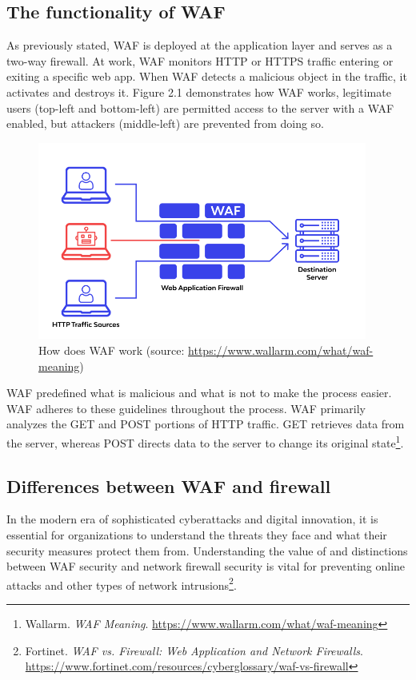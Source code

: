 \subsection{The functionality of WAF}
\label{subsec:waf_work}
\hspace{0.5cm}As previously stated, WAF is deployed at the application layer and serves as a two-way firewall. At work, WAF monitors HTTP or HTTPS traffic entering or exiting a specific web app. When WAF detects a malicious object in the traffic, it activates and destroys it. Figure 2.1 demonstrates how WAF works, legitimate users (top-left and bottom-left) are permitted access to the server with a WAF enabled, but attackers (middle-left) are prevented from doing so.
\begin{figure}[!h]
   
	\centering
	\includegraphics[width=\linewidth, height=6.5cm,keepaspectratio]{figures/wallarmwaf.png}
	\caption{How does WAF work (source: \url{https://www.wallarm.com/what/waf-meaning})}\label{Fig:Data1}
  
\end{figure} 

\newpage
WAF predefined what is malicious and what is not to make the process easier. WAF adheres to these guidelines throughout the process. WAF primarily analyzes the GET and POST portions of HTTP traffic. GET retrieves data from the server, whereas POST directs data to the server to change its original state\footnote{Wallarm. \textit{WAF Meaning}. \url{https://www.wallarm.com/what/waf-meaning}}.



\subsection{Differences between WAF and firewall}
\label{subsec:versus}
\hspace{0.5cm}In the modern era of sophisticated cyberattacks and digital innovation, it is essential for organizations to understand the threats they face and what their security measures protect them from. Understanding the value of and distinctions between WAF security and network firewall security is vital for preventing online attacks and other types of network intrusions\footnote{Fortinet. \textit{WAF vs. Firewall: Web Application and Network Firewalls}. 
\url{https://www.fortinet.com/resources/cyberglossary/waf-vs-firewall}}.

